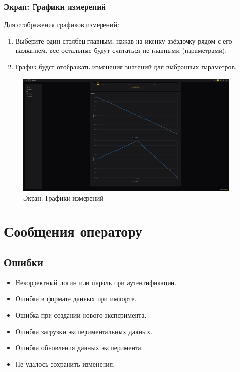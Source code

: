 \documentclass[a4paper,12pt,reqno]{article}
\begin{document}
\subsubsection{Экран: Графики измерений}
Для отображения графиков измерений:
\begin{enumerate}
    \item Выберите один столбец главным, нажав на иконку-звёздочку рядом с его названием, все остальные будут считаться не главными (параметрами).
    \item График будет отображать изменения значений для выбранных параметров.
\end{enumerate}
\begin{figure}[H]
    \centering
    \includegraphics[width=\textwidth]{RO/img/lab_charts.png} %
    \caption{Экран: Графики измерений}
    \label{fig:lab_charts}
\end{figure}

\section{Сообщения оператору}
\subsection{Ошибки}
\begin{itemize}
    \item Некорректный логин или пароль при аутентификации.
    \item Ошибка в формате данных при импорте.
    \item Ошибка при создании нового эксперимента.
    \item Ошибка загрузки экспериментальных данных.
    \item Ошибка обновления данных эксперимента.
    \item Не удалось сохранить изменения.
\end{itemize}
\end{document}
